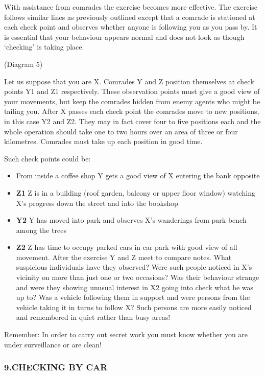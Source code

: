 With assistance from comrades the exercise becomes more effective. The
exercise follows similar lines as previously outlined except that a
comrade is stationed at each check point and observes whether anyone is
following you as you pass by. It is essential that your behaviour
appears normal and does not look as though `checking' is taking place.

(Diagram 5)

Let us suppose that you are X. Comrades Y and Z position themselves at
check points Y1 and Z1 respectively. These observation points must give
a good view of your movements, but keep the comrades hidden from enemy
agents who might be tailing you. After X passes each check point the
comrades move to new positions, in this case Y2 and Z2. They may in fact
cover four to five positions each and the whole operation should take
one to two hours over an area of three or four kilometres. Comrades must
take up each position in good time.

Such check points could be:

\begin{itemize}
\tightlist
\item
  From inside a coffee shop Y gets a good view of X entering the bank
  opposite
\item
  \textbf{Z1} Z is in a building (roof garden, balcony or upper floor
  window) watching X's progress down the street and into the bookshop
\item
  \textbf{Y2} Y has moved into park and observes X's wanderings from
  park bench among the trees
\item
  \textbf{Z2} Z has time to occupy parked cars in car park with good
  view of all movement. After the exercise Y and Z meet to compare
  notes. What suspicious individuals have they observed? Were such
  people noticed in X's vicinity on more than just one or two occasions?
  Was their behaviour strange and were they showing unusual interest in
  X2 going into check what he was up to? Was a vehicle following them in
  support and were persons from the vehicle taking it in turns to follow
  X? Such persons are more easily noticed and remembered in quiet rather
  than busy areas!
\end{itemize}

Remember: In order to carry out secret work you must know whether you
are under surveillance or are clean!

\subsubsection{9.CHECKING BY CAR}

